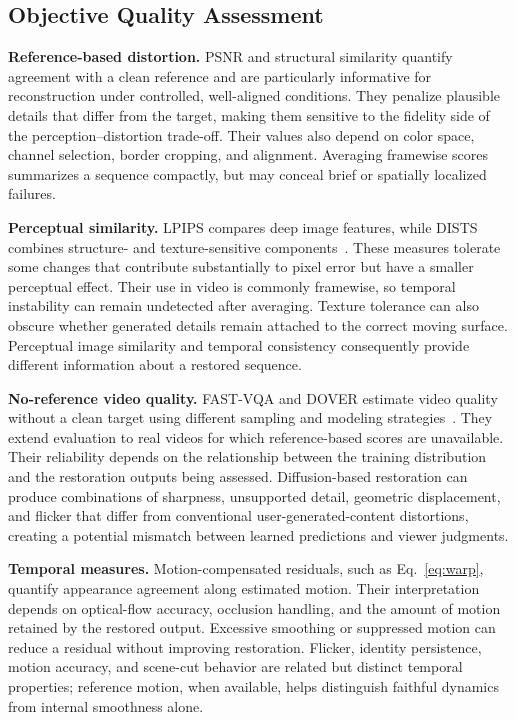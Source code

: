 \subsection{Objective Quality Assessment}
\textbf{Reference-based distortion.} PSNR and structural similarity quantify agreement with a clean reference and are particularly informative for reconstruction under controlled, well-aligned conditions. They penalize plausible details that differ from the target, making them sensitive to the fidelity side of the perception--distortion trade-off. Their values also depend on color space, channel selection, border cropping, and alignment. Averaging framewise scores summarizes a sequence compactly, but may conceal brief or spatially localized failures.

\textbf{Perceptual similarity.} LPIPS compares deep image features, while DISTS combines structure- and texture-sensitive components~\cite{lpips,dists}. These measures tolerate some changes that contribute substantially to pixel error but have a smaller perceptual effect. Their use in video is commonly framewise, so temporal instability can remain undetected after averaging. Texture tolerance can also obscure whether generated details remain attached to the correct moving surface. Perceptual image similarity and temporal consistency consequently provide different information about a restored sequence.

\textbf{No-reference video quality.} FAST-VQA and DOVER estimate video quality without a clean target using different sampling and modeling strategies~\cite{fastvqa,dover}. They extend evaluation to real videos for which reference-based scores are unavailable. Their reliability depends on the relationship between the training distribution and the restoration outputs being assessed. Diffusion-based restoration can produce combinations of sharpness, unsupported detail, geometric displacement, and flicker that differ from conventional user-generated-content distortions, creating a potential mismatch between learned predictions and viewer judgments.

\textbf{Temporal measures.} Motion-compensated residuals, such as Eq.~\eqref{eq:warp}, quantify appearance agreement along estimated motion. Their interpretation depends on optical-flow accuracy, occlusion handling, and the amount of motion retained by the restored output. Excessive smoothing or suppressed motion can reduce a residual without improving restoration. Flicker, identity persistence, motion accuracy, and scene-cut behavior are related but distinct temporal properties; reference motion, when available, helps distinguish faithful dynamics from internal smoothness alone.

